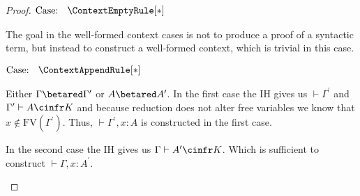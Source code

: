 \begin{proof}
$\text{Case: }\begin{array}{c} \ContextEmptyRule[*] \end{array}$
\begin{proofcase}
    The goal in the well-formed context cases is not to produce a proof of a syntactic term, but instead to construct a well-formed context, which is trivial in this case.
\end{proofcase}

$\text{Case: }\begin{array}{c} \ContextAppendRule[*] \end{array}$
\begin{proofcase}
    Either $\Gamma \betared \Gamma^\prime$ or $A \betared A^\prime$.
    In the first case the IH gives us $\vdash \Gamma^\prime$ and $\Gamma^\prime \vdash A \cinfr K$ and because reduction does not alter free variables we know that $x \notin \text{FV}(\Gamma^\prime)$.
    Thus, $\vdash \Gamma^\prime, x : A$ is constructed in the first case.

    In the second case the IH gives us $\Gamma \vdash A^\prime \cinfr K$.
    Which is sufficient to construct $\vdash \Gamma, x : A^\prime$.
\end{proofcase}
\end{proof}
